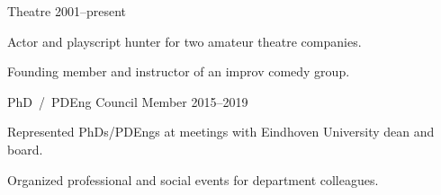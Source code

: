
\begin{cventries}
    \cventry%
        {Theatre} %
        {} %
        {}%
        {2001--present} %
        {\begin{cvitems}
            \item {Actor and playscript hunter for two amateur theatre companies.}
            \item {Founding member and instructor of an improv comedy group.}
        \end{cvitems}}

    \cventry%
        {PhD~/~PDEng Council Member} %
        {} %
        {} %
        {2015--2019} %
        {\begin{cvitems}
            \item {Represented PhDs/PDEngs at meetings with Eindhoven University dean and board.}
            \item {Organized professional and social events for department colleagues.}
        \end{cvitems}}

\end{cventries}

